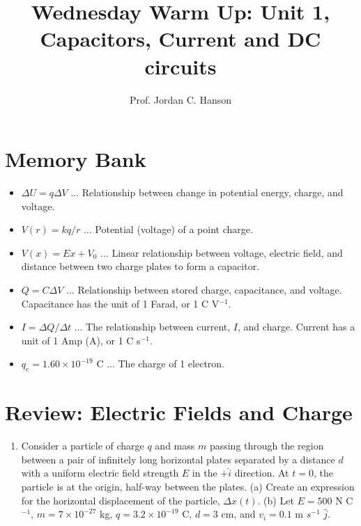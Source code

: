 \documentclass{article}
\begin{document}
\twocolumn

\title{Wednesday Warm Up: Unit 1, Capacitors, Current and DC circuits}
\author{Prof. Jordan C. Hanson}

\maketitle

\section{Memory Bank}

\begin{itemize}
\item $\Delta U = q\Delta V$ ... Relationship between change in potential energy, charge, and voltage.
\item $V(r) = k q / r$ ... Potential (voltage) of a point charge.
\item $V(x) = E x + V_0$ ... Linear relationship between voltage, electric field, and distance between two charge plates to form a capacitor.
\item $Q = C\Delta V$ ... Relationship between stored charge, capacitance, and voltage.  Capacitance has the unit of 1 Farad, or 1 C V$^{-1}$.
\item $I = \Delta Q / \Delta t$ ... The relationship between current, $I$, and charge.  Current has a unit of 1 Amp (A), or 1 C s$^{-1}$.  
\item $q_e = 1.60 \times 10^{-19}$ C ... The charge of 1 electron.
\end{itemize}

\section{Review: Electric Fields and Charge}

\begin{enumerate}
\item Consider a particle of charge $q$ and mass $m$ passing through the region between a pair of infinitely long horizontal plates separated by a distance $d$ with a uniform electric field strength $E$ in the $+\hat{i}$ direction. At $t=0$, the particle is at the origin, half-way between the plates.  (a) Create an expression for the horizontal displacement of the particle, $\Delta x(t)$.  (b) Let $E = 500$ N C$^{-1}$, $m = 7\times 10^{-27}$ kg, $q = 3.2 \times 10^{-19}$ C, $d = 3$ cm, and $v_i = 0.1$ m $s^{-1}$ $\hat{j}$. \\ \vspace{6cm}
\end{enumerate}
\end{document}
